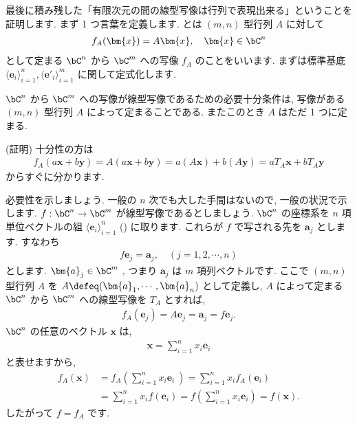 \documentclass[openany, a4paper, oneside]{jsbook}
\begin{document}
最後に積み残した「有限次元の間の線型写像は行列で表現出来る」ということを証明します.
まず 1 つ言葉を定義します.
とは $(m,n)$ 型行列 $A$ に対して
\begin{align}
 f_{A} ( \bm{x} )
 =
 A \bm{x}, \quad \bm{x} \in \bC^n
\end{align}
として定まる $\bC^n$ から $\bC^m$ への写像 $f_A$ のことをいいます.
まずは標準基底 $\langle \bm{e}_i \rangle _{i=1}^n,\langle \bm{e}'_i \rangle _{i=1}^m$ に関して定式化します.
\begin{thm}
 $\bC^n$ から $\bC^m$ への写像が線型写像であるための必要十分条件は,
 写像がある $(m,n)$ 型行列 $A$ によって定まることである.
 またこのとき $A$ はただ 1 つに定まる.
\end{thm}
(証明)
十分性の方は
\begin{align}
    f_A ( a \bm{x} + b \bm{y} )
    =
    A ( a \bm{x} + b \bm{y} )
    =
    a ( A \bm{x} ) + b ( A \bm{y} )
    =
    a T_A \bm{x} + b T_A \bm{y}
\end{align}
からすぐに分かります.

必要性を示しましょう.
一般の $n$ 次でも大した手間はないので, 一般の状況で示します.
$f : \bC^n \to \bC^m$ が線型写像であるとしましょう.
$\bC^n$ の座標系を $n$ 項単位ベクトルの組 $\langle \bm{e}_i \rangle _{i=1}^n$
() に取ります.
これらが $f$ で写される先を $\bm{a}_j$ とします.
すなわち
\begin{align}
    f \bm{e}_j
    =
    \bm{a}_j
    , \quad
    ( j = 1, 2, \dotsb , n)
\end{align}
とします.
 $\bm{a}_j \in \bC^m$ , つまり $\bm{a}_j$ は $m$ 項列ベクトルです.
ここで $(m,n)$ 型行列 $A$ を $A\defeq(\bm{a}_1,\dotsb,\bm{a}_n)$ として定義し,
 $A$ によって定まる $\bC^n$ から $\bC^m$ への線型写像を $T_A$ とすれば,
\begin{align}
    f_A ( \bm{e}_j )
    =
    A \bm{e}_j
    =
    \bm{a}_j
    =
    f \bm{e}_j.
\end{align}
$\bC^n$ の任意のベクトル $\bm{x}$ は,
\begin{align}
    \bm{x}
    =
    \sum_{i=1}^n x_i \bm{e}_i
\end{align}
と表せますから,
\begin{align}
    f_A ( \bm{x} )
    &=
    f_A \left ( \sum_{i=1}^n x_i \bm{e}_i \ \right)
    =
    \sum_{i=1}^n x_i f_A ( \bm{e}_i ) \\
    &=
    \sum_{i=1}^n x_i f ( \bm{e}_i )
    =
    f \left ( \sum_{i=1}^n x_i \bm{e}_i \right)
    =
    f ( \bm{x} ).
\end{align}
したがって $f=f_A$ です.
\end{document}
